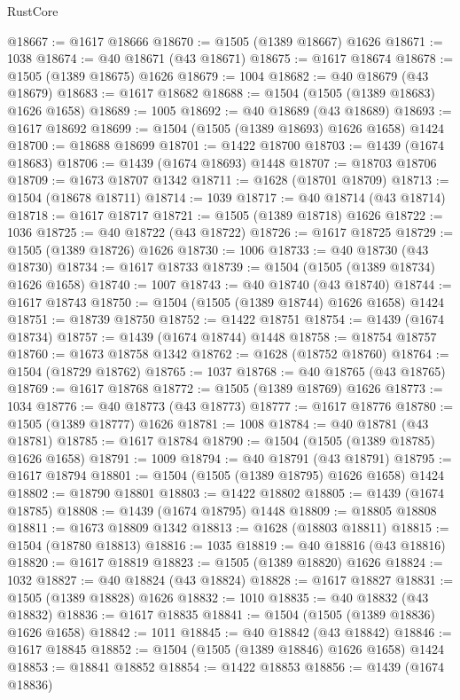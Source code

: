 \begin{lexlean}{RustCore}
\begin{coremodule}
@18667 := @1617 @18666
@18670 := @1505 (@1389 @18667) @1626
@18671 := 1038
@18674 := @40 @18671 (@43 @18671)
@18675 := @1617 @18674
@18678 := @1505 (@1389 @18675) @1626
@18679 := 1004
@18682 := @40 @18679 (@43 @18679)
@18683 := @1617 @18682
@18688 := @1504 (@1505 (@1389 @18683) @1626 @1658)
@18689 := 1005
@18692 := @40 @18689 (@43 @18689)
@18693 := @1617 @18692
@18699 := @1504 (@1505 (@1389 @18693) @1626 @1658) @1424
@18700 := @18688 @18699
@18701 := @1422 @18700
@18703 := @1439 (@1674 @18683)
@18706 := @1439 (@1674 @18693) @1448
@18707 := @18703 @18706
@18709 := @1673 @18707 @1342
@18711 := @1628 (@18701 @18709)
@18713 := @1504 (@18678 @18711)
@18714 := 1039
@18717 := @40 @18714 (@43 @18714)
@18718 := @1617 @18717
@18721 := @1505 (@1389 @18718) @1626
@18722 := 1036
@18725 := @40 @18722 (@43 @18722)
@18726 := @1617 @18725
@18729 := @1505 (@1389 @18726) @1626
@18730 := 1006
@18733 := @40 @18730 (@43 @18730)
@18734 := @1617 @18733
@18739 := @1504 (@1505 (@1389 @18734) @1626 @1658)
@18740 := 1007
@18743 := @40 @18740 (@43 @18740)
@18744 := @1617 @18743
@18750 := @1504 (@1505 (@1389 @18744) @1626 @1658) @1424
@18751 := @18739 @18750
@18752 := @1422 @18751
@18754 := @1439 (@1674 @18734)
@18757 := @1439 (@1674 @18744) @1448
@18758 := @18754 @18757
@18760 := @1673 @18758 @1342
@18762 := @1628 (@18752 @18760)
@18764 := @1504 (@18729 @18762)
@18765 := 1037
@18768 := @40 @18765 (@43 @18765)
@18769 := @1617 @18768
@18772 := @1505 (@1389 @18769) @1626
@18773 := 1034
@18776 := @40 @18773 (@43 @18773)
@18777 := @1617 @18776
@18780 := @1505 (@1389 @18777) @1626
@18781 := 1008
@18784 := @40 @18781 (@43 @18781)
@18785 := @1617 @18784
@18790 := @1504 (@1505 (@1389 @18785) @1626 @1658)
@18791 := 1009
@18794 := @40 @18791 (@43 @18791)
@18795 := @1617 @18794
@18801 := @1504 (@1505 (@1389 @18795) @1626 @1658) @1424
@18802 := @18790 @18801
@18803 := @1422 @18802
@18805 := @1439 (@1674 @18785)
@18808 := @1439 (@1674 @18795) @1448
@18809 := @18805 @18808
@18811 := @1673 @18809 @1342
@18813 := @1628 (@18803 @18811)
@18815 := @1504 (@18780 @18813)
@18816 := 1035
@18819 := @40 @18816 (@43 @18816)
@18820 := @1617 @18819
@18823 := @1505 (@1389 @18820) @1626
@18824 := 1032
@18827 := @40 @18824 (@43 @18824)
@18828 := @1617 @18827
@18831 := @1505 (@1389 @18828) @1626
@18832 := 1010
@18835 := @40 @18832 (@43 @18832)
@18836 := @1617 @18835
@18841 := @1504 (@1505 (@1389 @18836) @1626 @1658)
@18842 := 1011
@18845 := @40 @18842 (@43 @18842)
@18846 := @1617 @18845
@18852 := @1504 (@1505 (@1389 @18846) @1626 @1658) @1424
@18853 := @18841 @18852
@18854 := @1422 @18853
@18856 := @1439 (@1674 @18836)

\end{coremodule}
\end{lexlean}
